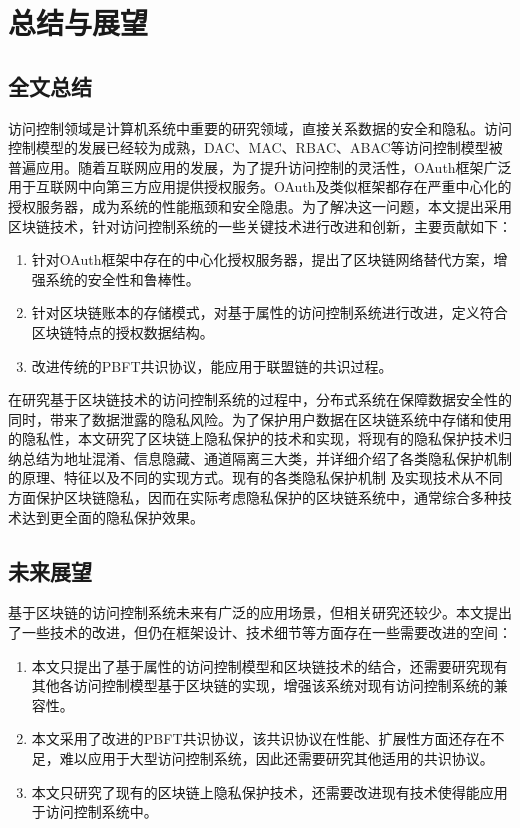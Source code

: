 
\chapter{总结与展望}

\section{全文总结}

访问控制领域是计算机系统中重要的研究领域，直接关系数据的安全和隐私。访问控制模型的发展已经较为成熟，DAC、MAC、RBAC、ABAC等访问控制模型被普遍应用。随着互联网应用的发展，为了提升访问控制的灵活性，OAuth框架广泛用于互联网中向第三方应用提供授权服务。OAuth及类似框架都存在严重中心化的授权服务器，成为系统的性能瓶颈和安全隐患。为了解决这一问题，本文提出采用区块链技术，针对访问控制系统的一些关键技术进行改进和创新，主要贡献如下：

\begin{enumerate}
	\item 针对OAuth框架中存在的中心化授权服务器，提出了区块链网络替代方案，增强系统的安全性和鲁棒性。
	\item 针对区块链账本的存储模式，对基于属性的访问控制系统进行改进，定义符合区块链特点的授权数据结构。
	\item 改进传统的PBFT共识协议，能应用于联盟链的共识过程。
\end{enumerate}

在研究基于区块链技术的访问控制系统的过程中，分布式系统在保障数据安全性的同时，带来了数据泄露的隐私风险。为了保护用户数据在区块链系统中存储和使用的隐私性，本文研究了区块链上隐私保护的技术和实现，将现有的隐私保护技术归纳总结为地址混淆、信息隐藏、通道隔离三大类，并详细介绍了各类隐私保护机制的原理、特征以及不同的实现方式。现有的各类隐私保护机制 及实现技术从不同方面保护区块链隐私，因而在实际考虑隐私保护的区块链系统中，通常综合多种技术达到更全面的隐私保护效果。

\section{未来展望}

基于区块链的访问控制系统未来有广泛的应用场景，但相关研究还较少。本文提出了一些技术的改进，但仍在框架设计、技术细节等方面存在一些需要改进的空间：

\begin{enumerate}
	\item 本文只提出了基于属性的访问控制模型和区块链技术的结合，还需要研究现有其他各访问控制模型基于区块链的实现，增强该系统对现有访问控制系统的兼容性。
	\item 本文采用了改进的PBFT共识协议，该共识协议在性能、扩展性方面还存在不足，难以应用于大型访问控制系统，因此还需要研究其他适用的共识协议。
	\item 本文只研究了现有的区块链上隐私保护技术，还需要改进现有技术使得能应用于访问控制系统中。
\end{enumerate}